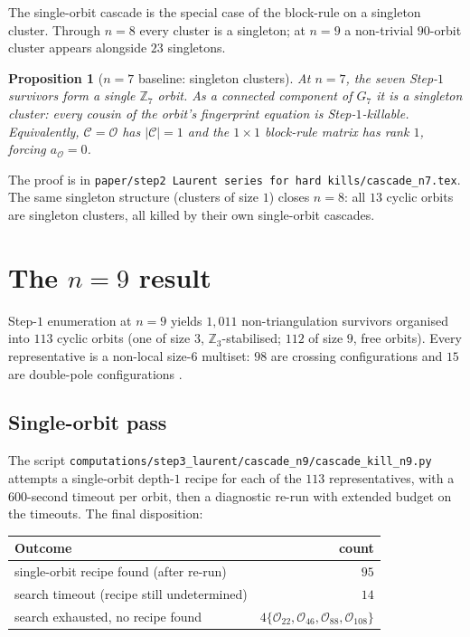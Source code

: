 \documentclass[11pt]{article}
\newtheorem{prop}[thm]{Proposition}
\theoremstyle{definition}
\begin{document}
The single-orbit cascade is the special case of the block-rule on a
singleton cluster. Through $n=8$ every cluster is a singleton; at
$n=9$ a non-trivial $90$-orbit cluster appears alongside $23$
singletons.

\begin{prop}[$n=7$ baseline: singleton clusters]\label{prop:n7}
At $n=7$, the seven Step-$1$ survivors form a single $\mathbb Z_7$
orbit. As a connected component of $G_7$ it is a singleton
cluster: every cousin of the orbit's fingerprint equation is
Step-$1$-killable. Equivalently, $\mathcal C=\mathcal O$ has
$|\mathcal C|=1$ and the $1\times 1$ block-rule matrix has rank $1$,
forcing $a_{\mathcal O}=0$.
\end{prop}

The proof is in \verb|paper/step2 Laurent series for hard kills/cascade_n7.tex|.
The same singleton structure (clusters of size $1$) closes
$n=8$: all $13$ cyclic orbits are singleton clusters, all killed
by their own single-orbit cascades.

\section{The $n=9$ result}\label{sec:n9}

Step-$1$ enumeration at $n=9$ yields $1{,}011$ non-triangulation
survivors organised into $113$ cyclic orbits (one of size $3$,
$\mathbb Z_3$-stabilised; $112$ of size $9$, free orbits). Every
representative is a non-local size-$6$ multiset: $98$ are crossing
configurations and $15$ are double-pole configurations \cite{n9status}.

\subsection{Single-orbit pass}\label{subsec:single}

The script
\verb|computations/step3_laurent/cascade_n9/cascade_kill_n9.py|
attempts a single-orbit depth-$1$ recipe for each of the $113$
representatives, with a $600$-second timeout per orbit, then a
diagnostic re-run with extended budget on the timeouts. The final
disposition:

\begin{center}
\begin{tabular}{lr}
\toprule
Outcome & count \\
\midrule
single-orbit recipe found (after re-run) & $95$ \\
search timeout (recipe still undetermined) & $14$ \\
search exhausted, no recipe found &
$4$\quad $\{\mathcal O_{22},\mathcal O_{46},\mathcal O_{88},\mathcal O_{108}\}$ \\
\bottomrule
\end{tabular}
\end{center}
\end{document}
